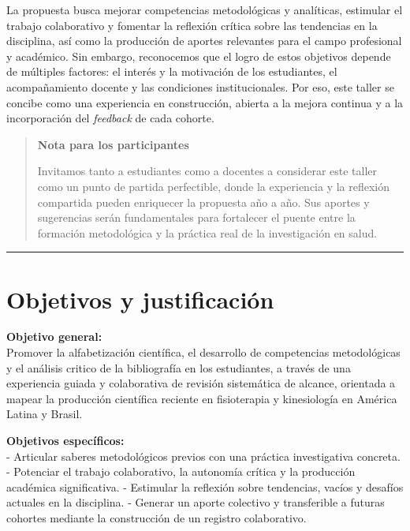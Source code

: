 \documentclass[
  letterpaper,
]{book}
\begin{document}
La propuesta busca mejorar competencias metodológicas y analíticas,
estimular el trabajo colaborativo y fomentar la reflexión crítica sobre
las tendencias en la disciplina, así como la producción de aportes
relevantes para el campo profesional y académico. Sin embargo,
reconocemos que el logro de estos objetivos depende de múltiples
factores: el interés y la motivación de los estudiantes, el
acompañamiento docente y las condiciones institucionales. Por eso, este
taller se concibe como una experiencia en construcción, abierta a la
mejora continua y a la incorporación del \emph{feedback} de cada
cohorte.

\begin{quote}
\textbf{Nota para los participantes}

Invitamos tanto a estudiantes como a docentes a considerar este taller
como un punto de partida perfectible, donde la experiencia y la
reflexión compartida pueden enriquecer la propuesta año a año. Sus
aportes y sugerencias serán fundamentales para fortalecer el puente
entre la formación metodológica y la práctica real de la investigación
en salud.
\end{quote}

\begin{center}\rule{0.5\linewidth}{0.5pt}\end{center}

\section{Objetivos y justificación}\label{objetivos-y-justificaciuxf3n}

\textbf{Objetivo general:}\\
Promover la alfabetización científica, el desarrollo de competencias
metodológicas y el análisis critico de la bibliografía en los
estudiantes, a través de una experiencia guiada y colaborativa de
revisión sistemática de alcance, orientada a mapear la producción
científica reciente en fisioterapia y kinesiología en América Latina y
Brasil.

\textbf{Objetivos específicos:}\\
- Articular saberes metodológicos previos con una práctica investigativa
concreta. - Potenciar el trabajo colaborativo, la autonomía crítica y la
producción académica significativa. - Estimular la reflexión sobre
tendencias, vacíos y desafíos actuales en la disciplina. - Generar un
aporte colectivo y transferible a futuras cohortes mediante la
construcción de un registro colaborativo.
\end{document}
